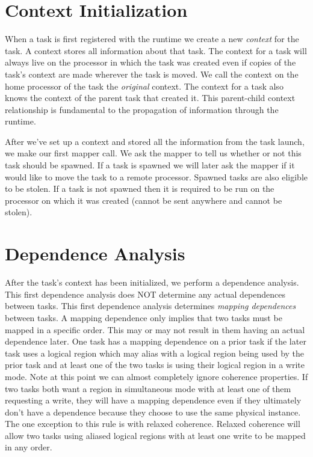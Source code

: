 \section{Context Initialization}
When a task is first registered with the runtime we create a new {\em context} for the task.  
A context stores all information about that task.  The context for a task will always 
live on the processor in which the task was created even if copies of the task's context 
are made wherever the task is moved.  We call the context on the home processor of the 
task the {\em original} context.  The context for a task also knows the context of the parent 
task that created it.  This parent-child context relationship is fundamental to the propagation 
of information through the runtime.

After we've set up a context and stored all the information from the task launch, we make 
our first mapper call.  We ask the mapper to tell us whether or not this task should be spawned.  
If a task is spawned we will later ask the mapper if it would like to move the task to a remote 
processor.  Spawned tasks are also eligible to be stolen.  If a task is not spawned then it 
is required to be run on the processor on which it was created (cannot be sent anywhere and 
cannot be stolen).

\section{Dependence Analysis}
After the task's context has been initialized, we perform a dependence analysis.  This first 
dependence analysis does NOT determine any actual dependences between tasks.  This first dependence 
analysis determines {\em mapping dependences} between tasks.  A mapping dependence only implies that two 
tasks must be mapped in a specific order.  This may or may not result in them having an actual 
dependence later.  One task has a mapping dependence on a prior task if the later task uses a logical 
region which may alias with a logical region being used by the prior task and at least one of the two 
tasks is using their logical region in a write mode.  Note at this point we can almost completely 
ignore coherence properties.  If two tasks both want a region in simultaneous mode with at least 
one of them requesting a write, they will have a mapping dependence even if they ultimately don't 
have a dependence because they choose to use the same physical instance.  The one exception to this 
rule is with relaxed coherence.  Relaxed coherence will allow two tasks using aliased logical regions 
with at least one write to be mapped in any order.   

